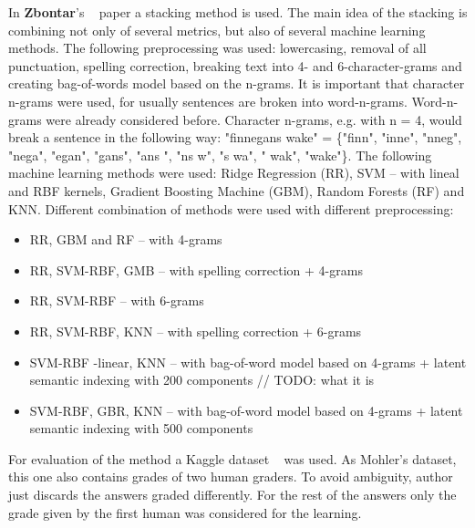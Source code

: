 In \textbf{Zbontar}'s ~\cite{Zbontar} paper a stacking method is used. The main idea of the stacking is combining not only of several metrics, but also of several machine learning methods. The following preprocessing was used: lowercasing, removal of all punctuation, spelling correction, breaking text into 4- and 6-character-grams and creating bag-of-words model based on the n-grams. It is important that character n-grams were used, for usually sentences are broken into word-n-grams. Word-n-grams were already considered before. Character n-grams, e.g. with n = 4, would break a sentence in the following way: "finnegans wake" = \{"finn", "inne", "nneg", "nega", "egan", "gans", "ans ", "ns w", "s wa", " wak", "wake"\}. The following machine learning methods were used: Ridge Regression (RR), SVM -- with lineal and RBF kernels, Gradient Boosting Machine (GBM), Random Forests (RF) and KNN. Different combination of methods were used with different preprocessing:
\begin{itemize}
\item RR, GBM and RF -- with 4-grams
\item RR, SVM-RBF, GMB -- with spelling correction + 4-grams
\item RR, SVM-RBF -- with 6-grams
\item RR, SVM-RBF, KNN -- with spelling correction + 6-grams
\item SVM-RBF -linear, KNN -- with bag-of-word model based on 4-grams + latent semantic indexing with 200 components // TODO: what it is
\item SVM-RBF, GBR, KNN -- with bag-of-word model based on 4-grams + latent semantic indexing with 500 components
\end{itemize}

For evaluation of the method a Kaggle dataset ~\cite{kaggleSas} was used. As Mohler's dataset, this one also contains grades of two human graders. To avoid ambiguity, author just discards the answers graded differently. For the rest of the answers only the grade given by the first human was considered for the learning.

